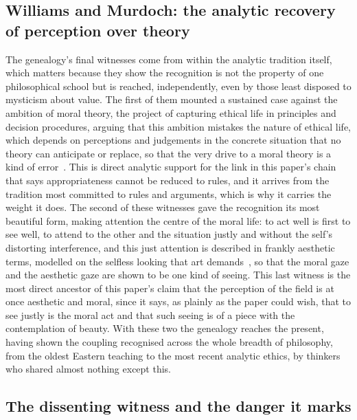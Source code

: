 \subsection{Williams and Murdoch: the analytic recovery of perception over theory}
\label{p22:sub:gen-williams-murdoch}

The genealogy's final witnesses come from within the analytic tradition itself, which matters because they show the recognition is not the property of one philosophical school but is reached, independently, even by those least disposed to mysticism about value. The first of them mounted a sustained case against the ambition of moral theory, the project of capturing ethical life in principles and decision procedures, arguing that this ambition mistakes the nature of ethical life, which depends on perceptions and judgements in the concrete situation that no theory can anticipate or replace, so that the very drive to a moral theory is a kind of error~\parencite{williams_limits}. This is direct analytic support for the link in this paper's chain that says appropriateness cannot be reduced to rules, and it arrives from the tradition most committed to rules and arguments, which is why it carries the weight it does. The second of these witnesses gave the recognition its most beautiful form, making attention the centre of the moral life: to act well is first to see well, to attend to the other and the situation justly and without the self's distorting interference, and this just attention is described in frankly aesthetic terms, modelled on the selfless looking that art demands~\parencite{murdoch_sovereignty}, so that the moral gaze and the aesthetic gaze are shown to be one kind of seeing. This last witness is the most direct ancestor of this paper's claim that the perception of the field is at once aesthetic and moral, since it says, as plainly as the paper could wish, that to see justly is the moral act and that such seeing is of a piece with the contemplation of beauty. With these two the genealogy reaches the present, having shown the coupling recognised across the whole breadth of philosophy, from the oldest Eastern teaching to the most recent analytic ethics, by thinkers who shared almost nothing except this.

\subsection{The dissenting witness and the danger it marks}
\label{p22:sub:gen-dissent}

